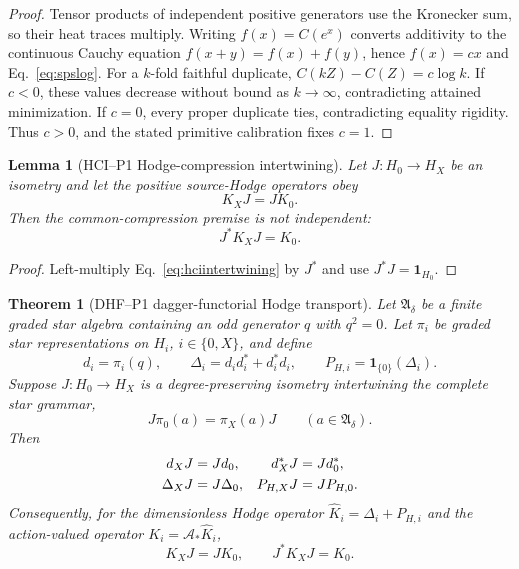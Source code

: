 \documentclass[11pt,a4paper]{article}
\newtheorem{theorem}[definition]{Theorem}
\newtheorem{lemma}[definition]{Lemma}
\theoremstyle{remark}
\newcommand{\id}{\mathbf 1}
\begin{document}
\begin{proof}
Tensor products of independent positive generators use the Kronecker sum,
so their heat traces multiply.  Writing $f(x)=C(e^x)$ converts additivity to
the continuous Cauchy equation $f(x+y)=f(x)+f(y)$, hence $f(x)=cx$ and
Eq.~\eqref{eq:spslog}.  For a $k$-fold faithful duplicate,
$C(kZ)-C(Z)=c\log k$.  If $c<0$, these values decrease without bound as
$k\to\infty$, contradicting attained minimization.  If $c=0$, every proper
duplicate ties, contradicting equality rigidity.  Thus $c>0$, and the stated
primitive calibration fixes $c=1$.
\end{proof}

\begin{lemma}[HCI--P1 Hodge-compression intertwining]
Let $J:H_0\to H_X$ be an isometry and let the positive source-Hodge
operators obey
\begin{equation}
 K_XJ=JK_0.
 \label{eq:hciintertwining}
\end{equation}
Then the common-compression premise is not independent:
\begin{equation}
 J^*K_XJ=K_0.
 \label{eq:hcicompression}
\end{equation}
\label{lem:hcicompression}
\end{lemma}

\begin{proof}
Left-multiply Eq.~\eqref{eq:hciintertwining} by $J^*$ and use
$J^*J=\id_{H_0}$.
\end{proof}

\begin{theorem}[DHF--P1 dagger-functorial Hodge transport]
Let $\mathfrak A_\delta$ be a finite graded star algebra containing an odd
generator $q$ with $q^2=0$.  Let $\pi_i$ be graded star representations on
$H_i$, $i\in\{0,X\}$, and define
\begin{equation}
 d_i=\pi_i(q),\qquad
 \Delta_i=d_id_i^*+d_i^*d_i,\qquad
 P_{H,i}=\mathbf 1_{\{0\}}(\Delta_i).
 \label{eq:dhfhodge}
\end{equation}
Suppose $J:H_0\to H_X$ is a degree-preserving isometry intertwining the
complete star grammar,
\begin{equation}
 J\pi_0(a)=\pi_X(a)J
 \qquad(a\in\mathfrak A_\delta).
 \label{eq:dhfstarintertwiner}
\end{equation}
Then
\begin{align}
 d_XJ&=Jd_0,&d_X^*J&=Jd_0^*,\notag\\
 \Delta_XJ&=J\Delta_0,&P_{H,X}J&=JP_{H,0}.
 \label{eq:dhfchain}
\end{align}
Consequently, for the dimensionless Hodge operator
$\widehat K_i=\Delta_i+P_{H,i}$ and the action-valued operator
$K_i=\mathcal A_*\widehat K_i$,
\begin{equation}
 K_XJ=JK_0,
 \qquad J^*K_XJ=K_0.
 \label{eq:dhfcompression}
\end{equation}
\label{thm:dhfhodge}
\end{theorem}
\end{document}
